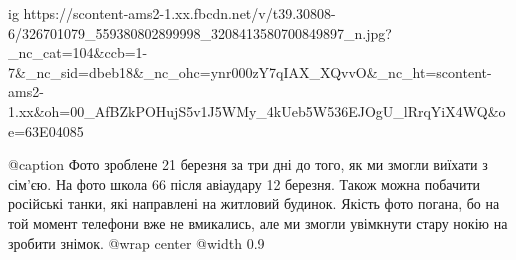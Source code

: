  
 
 
 
 


\ifcmt
  ig https://scontent-ams2-1.xx.fbcdn.net/v/t39.30808-6/326701079_559380802899998_3208413580700849897_n.jpg?_nc_cat=104&ccb=1-7&_nc_sid=dbeb18&_nc_ohc=ynr000zY7qIAX_XQvvO&_nc_ht=scontent-ams2-1.xx&oh=00_AfBZkPOHujS5v1J5WMy_4kUeb5W536EJOgU_lRrqYiX4WQ&oe=63E04085

  @caption Фото зроблене 21 березня за три дні до того, як ми змогли виїхати з сім'єю. На фото школа 66 після авіаудару 12 березня. Також можна побачити російські танки, які направлені на житловий будинок. Якість фото погана, бо на той момент телефони вже не вмикались, але ми змогли увімкнути стару нокію на зробити знімок.
  @wrap center
  @width 0.9
\fi

